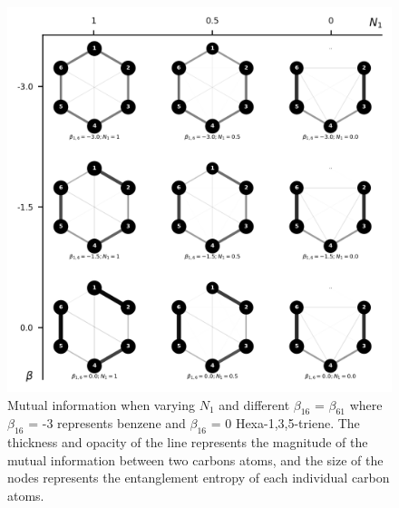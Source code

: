 \documentclass[twoside,twocolumn,9pt]{article}
\begin{document}
\begin{center}
  \begin{figure}[!htbp]
      \includegraphics[width=\textwidth]{Benzene-correlation-potential-and-one-adjacent-beta.png}
      \caption{Mutual information when varying $N_1$ and different $\beta_{16}$ = $\beta_{61}$ where $\beta_{16}$  = -3 represents benzene and $\beta_{16}$ = 0 Hexa-1,3,5-triene. The thickness and opacity of the line represents the magnitude of the mutual information between two carbons atoms, and the size of the nodes represents the entanglement entropy of each individual carbon atoms.}
      \label{pericyclic-correlation}
  \end{figure}
\end{center}
\end{document}
